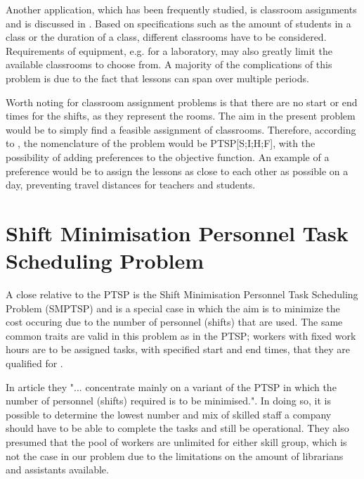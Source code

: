 Another application, which has been frequently studied, is classroom assignments and is discussed in \citet{krishnamoorthy_2001}. Based on specifications such as the amount of students in a class or the duration of a class, different classrooms have to be considered. Requirements of equipment, e.g. for a laboratory, may also greatly limit the available classrooms to choose from. A majority of the complications of this problem is due to the fact that lessons can span over multiple periods. 

Worth noting for classroom assignment problems is that there are no start or end times for the shifts, as they represent the rooms. The aim in the present problem would be to simply find a feasible assignment of classrooms. Therefore, according to \citet{krishnamoorthy_2001}, the nomenclature of the problem would be PTSP[S;I;H;F], with the possibility of adding preferences to the objective function. An example of a preference would be to assign the lessons as close to each other as possible on a day, preventing travel distances for teachers and students.



%
%



\section{Shift Minimisation Personnel Task Scheduling Problem}\label{SMTSP}

A close relative to the PTSP is the Shift Minimisation Personnel Task Scheduling Problem (SMPTSP) and is a special case in which the aim is to minimize the cost occuring due to the number of personnel (shifts) that are used. The same common traits are valid in this problem as in the PTSP; workers with fixed work hours are to be assigned tasks, with specified start and end times, that they are qualified for \citet{krishnamoorthy_2012}.

In article \citet{krishnamoorthy_2012} they "... concentrate mainly on a variant of the PTSP in which the number of personnel (shifts) required is to be minimised.". In doing so, it is possible to determine the lowest number and mix of skilled staff a company should have to be able to complete the tasks and still be operational. They also presumed that the pool of workers are unlimited for either skill group, which is not the case in our problem due to the limitations on the amount of librarians and assistants available. 

